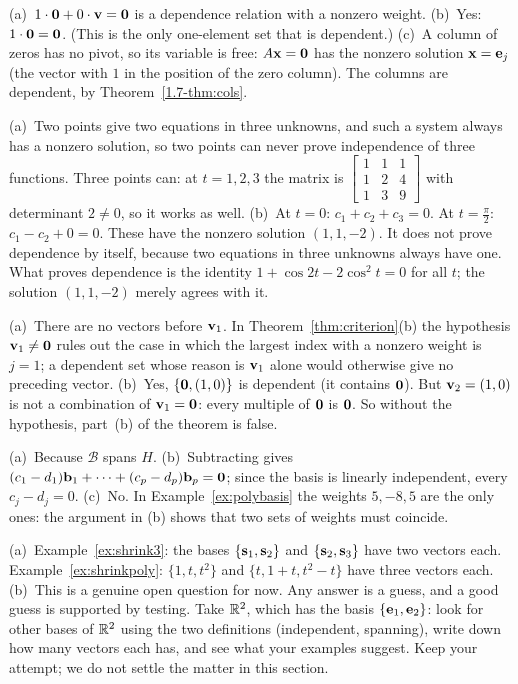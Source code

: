 \documentclass[11pt]{article}
\begin{document}
\begin{description}[leftmargin=0pt,itemsep=5pt]
  \item[Pause and think \ref{think:zerovec}.] (a)~$1\cdot\mathbf{0}+0\cdot\mathbf{v}=\mathbf{0}$ is a dependence relation with a nonzero weight. (b)~Yes: $1\cdot\mathbf{0}=\mathbf{0}$. (This is the only one-element set that is dependent.) (c)~A column of zeros has no pivot, so its variable is free: $A\mathbf{x}=\mathbf{0}$ has the nonzero solution $\mathbf{x}=\mathbf{e}_j$ (the vector with $1$ in the position of the zero column). The columns are dependent, by Theorem~\ref{1.7-thm:cols}.
  \item[Pause and think \ref{think:evalpts}.] (a)~Two points give two equations in three unknowns, and such a system always has a nonzero solution, so two points can never prove independence of three functions. Three points can: at $t=1,2,3$ the matrix is $\begin{bmatrix}1&1&1\\1&2&4\\1&3&9\end{bmatrix}$ with determinant $2\neq0$, so it works as well. (b)~At $t=0$: $c_1+c_2+c_3=0$. At $t=\tfrac{\pi}{2}$: $c_1-c_2+0=0$. These have the nonzero solution $(1,1,-2)$. It does not prove dependence by itself, because two equations in three unknowns always have one. What proves dependence is the identity $1+\cos2t-2\cos^2t=0$ for all $t$; the solution $(1,1,-2)$ merely agrees with it.
  \item[Pause and think \ref{think:order}.] (a)~There are no vectors before $\mathbf{v}_1$. In Theorem~\ref{thm:criterion}(b) the hypothesis $\mathbf{v}_1\neq\mathbf{0}$ rules out the case in which the largest index with a nonzero weight is $j=1$; a dependent set whose reason is $\mathbf{v}_1$ alone would otherwise give no preceding vector. (b)~Yes, $\{\mathbf{0},(1,0)\}$ is dependent (it contains $\mathbf{0}$). But $\mathbf{v}_2=(1,0)$ is not a combination of $\mathbf{v}_1=\mathbf{0}$: every multiple of $\mathbf{0}$ is $\mathbf{0}$. So without the hypothesis, part~(b) of the theorem is false.
  \item[Pause and think \ref{think:unique}.] (a)~Because $\mathcal{B}$ spans $H$. (b)~Subtracting gives $(c_1-d_1)\mathbf{b}_1+\cdots+(c_p-d_p)\mathbf{b}_p=\mathbf{0}$; since the basis is linearly independent, every $c_j-d_j=0$. (c)~No. In Example~\ref{ex:polybasis} the weights $5,-8,5$ are the only ones: the argument in (b) shows that two sets of weights must coincide.
  \item[Pause and think \ref{think:manybases}.] (a)~Example~\ref{ex:shrink3}: the bases $\{\mathbf{s}_1,\mathbf{s}_2\}$ and $\{\mathbf{s}_2,\mathbf{s}_3\}$ have two vectors each. Example~\ref{ex:shrinkpoly}: $\{1,t,t^2\}$ and $\{t,1+t,t^2-t\}$ have three vectors each. (b)~This is a genuine open question for now. Any answer is a guess, and a good guess is supported by testing. Take $\mathbb{R}^2$, which has the basis $\{\mathbf{e}_1,\mathbf{e}_2\}$: look for other bases of $\mathbb{R}^2$ using the two definitions (independent, spanning), write down how many vectors each has, and see what your examples suggest. Keep your attempt; we do not settle the matter in this section.

\end{description}
\end{document}
